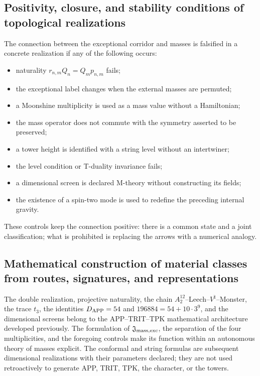 \subsection{Positivity, closure, and stability conditions of topological realizations}
The connection between the exceptional corridor and masses is falsified in a concrete realization if any of the following occurs:

\begin{itemize}
\item naturality \(r_{n,m}Q_n=Q_mp_{n,m}\) fails;
\item the exceptional label changes when the external masses are permuted;
\item a Moonshine multiplicity is used as a mass value without a Hamiltonian;
\item the mass operator does not commute with the symmetry asserted to be preserved;
\item a tower height is identified with a string level without an intertwiner;
\item the level condition or T-duality invariance fails;
\item a dimensional screen is declared M-theory without constructing its fields;
\item the existence of a spin-two mode is used to redefine the preceding
internal gravity.

\end{itemize}
These controls keep the connection positive: there is a common state and a joint classification; what is prohibited is replacing the arrows with a numerical analogy.

\subsection{Mathematical construction of material classes from routes, signatures, and representations}
The double realization, projective naturality, the chain \(A_2^{12}\)--Leech--\(V^\natural\)--Monster, the trace \(t_3\), the identities \(D_{\rm APP}=54\) and \(196884=54+10\cdot3^9\), and the dimensional screens belong to the APP--TRIT--TPK mathematical architecture developed previously. The formulation of \(\mathfrak J_{\rm mass,exc}\), the separation of the four multiplicities, and the foregoing controls make its function within an autonomous theory of masses explicit. The conformal and string formulas are subsequent dimensional realizations with their parameters declared; they are not used retroactively to generate APP, TRIT, TPK, the character, or the towers.
